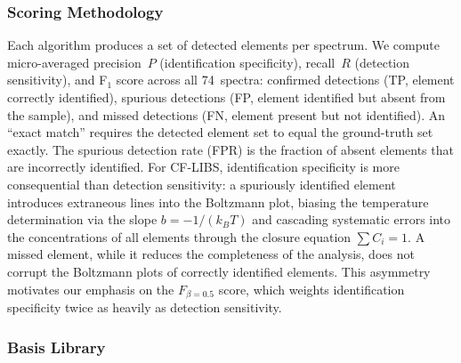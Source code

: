\subsubsection{Scoring Methodology}

Each algorithm produces a set of detected elements per spectrum.
We compute micro-averaged precision~$P$ (identification specificity), recall~$R$ (detection sensitivity), and F$_1$ score across all 74~spectra: confirmed detections (TP, element correctly identified), spurious detections (FP, element identified but absent from the sample), and missed detections (FN, element present but not identified).
An ``exact match'' requires the detected element set to equal the ground-truth set exactly.
The spurious detection rate (FPR) is the fraction of absent elements that are incorrectly identified.
For CF-LIBS, identification specificity is more consequential than detection sensitivity: a spuriously identified element introduces extraneous lines into the Boltzmann plot, biasing the temperature determination via the slope $b = -1/(k_B T)$ and cascading systematic errors into the concentrations of all elements through the closure equation $\sum C_i = 1$.
A missed element, while it reduces the completeness of the analysis, does not corrupt the Boltzmann plots of correctly identified elements.
This asymmetry motivates our emphasis on the $F_{\beta=0.5}$ score, which weights identification specificity twice as heavily as detection sensitivity.

\subsubsection{Basis Library}

